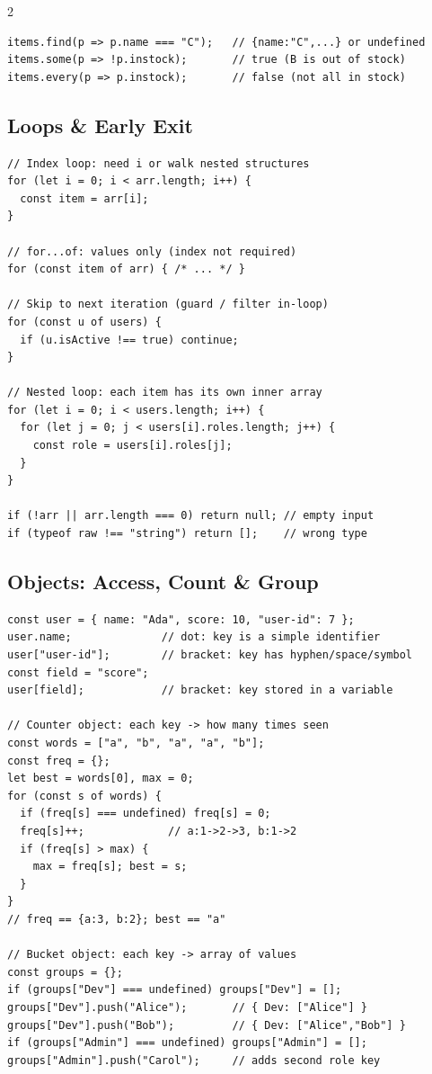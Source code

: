 \documentclass{article}
\begin{document}
\begin{multicols}{2}
\begin{lstlisting}[style=jsexam]
items.find(p => p.name === "C");   // {name:"C",...} or undefined
items.some(p => !p.instock);       // true (B is out of stock)
items.every(p => p.instock);       // false (not all in stock)
\end{lstlisting}

\columnbreak



\subsection{Loops \& Early Exit}
\begin{lstlisting}[style=jsexam]
// Index loop: need i or walk nested structures
for (let i = 0; i < arr.length; i++) {
  const item = arr[i];
}

// for...of: values only (index not required)
for (const item of arr) { /* ... */ }

// Skip to next iteration (guard / filter in-loop)
for (const u of users) {
  if (u.isActive !== true) continue;
}

// Nested loop: each item has its own inner array
for (let i = 0; i < users.length; i++) {
  for (let j = 0; j < users[i].roles.length; j++) {
    const role = users[i].roles[j];
  }
}

if (!arr || arr.length === 0) return null; // empty input
if (typeof raw !== "string") return [];    // wrong type
\end{lstlisting}

\subsection{Objects: Access, Count \& Group}
\begin{lstlisting}[style=jsexam]
const user = { name: "Ada", score: 10, "user-id": 7 };
user.name;              // dot: key is a simple identifier
user["user-id"];        // bracket: key has hyphen/space/symbol
const field = "score";
user[field];            // bracket: key stored in a variable

// Counter object: each key -> how many times seen
const words = ["a", "b", "a", "a", "b"];
const freq = {};
let best = words[0], max = 0;
for (const s of words) {
  if (freq[s] === undefined) freq[s] = 0;
  freq[s]++;             // a:1->2->3, b:1->2
  if (freq[s] > max) {
    max = freq[s]; best = s;
  }
}
// freq == {a:3, b:2}; best == "a"

// Bucket object: each key -> array of values
const groups = {};
if (groups["Dev"] === undefined) groups["Dev"] = [];
groups["Dev"].push("Alice");       // { Dev: ["Alice"] }
groups["Dev"].push("Bob");         // { Dev: ["Alice","Bob"] }
if (groups["Admin"] === undefined) groups["Admin"] = [];
groups["Admin"].push("Carol");     // adds second role key


\end{lstlisting}
\end{multicols}
\end{document}
